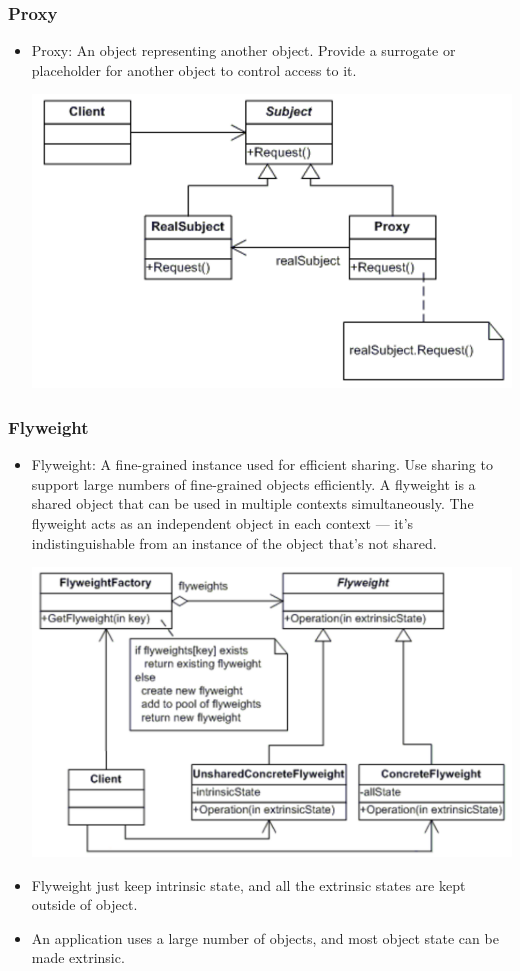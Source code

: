 \documentclass[a4paper,12pt,twoside]{book}
\begin{document}
\subsubsection{Proxy}
\begin{itemize}
\item Proxy: An object representing another object. Provide a surrogate or placeholder for another object to control access to it.

\includegraphics[scale=0.69]{pics/proxy.png}

\end{itemize}

\subsubsection{Flyweight}
\begin{itemize}
\item Flyweight: A fine-grained instance used for efficient sharing. Use sharing to support large numbers of fine-grained objects efficiently. A flyweight is a shared object that can be used in multiple contexts simultaneously. The flyweight acts as an independent object in each context — it's indistinguishable from an instance of the object that's not shared.

\includegraphics[scale=0.69]{pics/fly.png}

\item Flyweight just keep intrinsic state, and all the extrinsic states are kept outside of object. 

\item An application uses a large number of objects, and most object state can be made extrinsic. 

\end{itemize}
\end{document}
